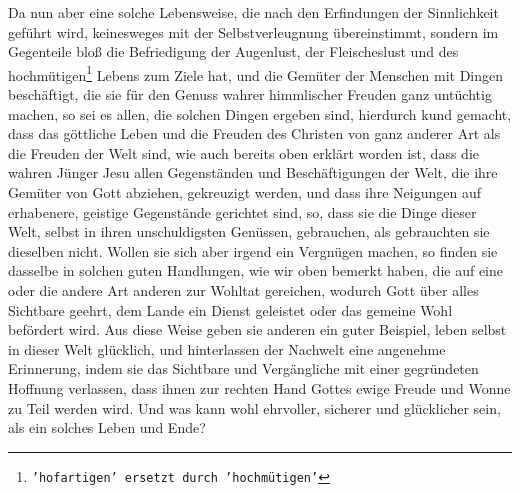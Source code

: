 Da nun aber eine solche Lebensweise, die nach den Erfindungen der Sinnlichkeit
geführt wird, keinesweges mit der Selbstverleugnung übereinstimmt, sondern im
Gegenteile bloß die Befriedigung der Augenlust, der Fleischeslust und des
hochmütigen\footnote{\texttt{'hofartigen' ersetzt durch 'hochmütigen'}} Lebens
zum 
Ziele hat, und die Gemüter der Menschen mit Dingen
beschäftigt, die sie für den Genuss wahrer himmlischer Freuden ganz untüchtig
machen, so sei es allen, die solchen Dingen ergeben sind, hierdurch kund
gemacht, dass
das göttliche Leben und die Freuden des Christen von ganz anderer Art als die
Freuden der Welt sind, wie auch bereits oben erklärt worden ist, dass die wahren
Jünger Jesu allen Gegenständen und Beschäftigungen der Welt, die ihre Gemüter
von Gott abziehen, gekreuzigt werden, und dass
ihre Neigungen 
auf erhabenere,
geistige Gegenstände gerichtet sind, so, dass sie die Dinge dieser Welt, selbst
in ihren unschuldigsten Genüssen, gebrauchen, als gebrauchten sie dieselben
nicht. Wollen sie sich aber irgend ein Vergnügen machen, so finden sie dasselbe
in solchen guten Handlungen, wie wir oben bemerkt haben, die auf eine oder die
andere Art anderen zur Wohltat gereichen, wodurch Gott über alles Sichtbare
geehrt, dem Lande ein Dienst geleistet oder das gemeine Wohl befördert wird.
Aus diese Weise geben sie anderen ein guter Beispiel, leben selbst in dieser
Welt
glücklich, und hinterlassen der Nachwelt eine angenehme
Erinnerung, indem sie
das Sichtbare und Vergängliche mit einer gegründeten Hoffnung verlassen, dass
ihnen zur rechten Hand Gottes ewige Freude und Wonne zu Teil werden wird. Und
was kann wohl ehrvoller, sicherer und glücklicher sein, als ein solches Leben
und Ende?

